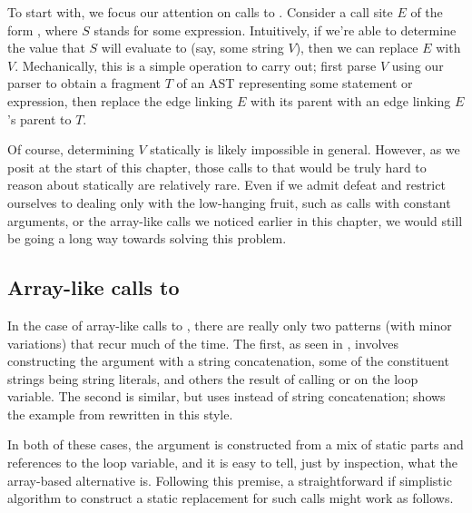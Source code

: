 To start with, we focus our attention on calls to . Consider a call
site $E$ of the form , where $S$ stands for some \matlab
expression. Intuitively, if we're able to determine the value that $S$ will
evaluate to (say, some string $V$), then we can replace $E$ with $V$.
Mechanically, this is a simple operation to carry out; first parse $V$ using
our \matlab parser to obtain a fragment $T$ of an AST representing some
statement or expression, then replace the edge linking $E$ with its parent with
an edge linking $E$'s parent to $T$.

Of course, determining $V$ statically is likely impossible in general. However,
as we posit at the start of this chapter, those calls to  that would
be truly hard to reason about statically are relatively rare. Even if we admit
defeat and restrict ourselves to dealing only with the low-hanging fruit, such
as calls with constant arguments, or the array-like calls we noticed earlier in
this chapter, we would still be going a long way towards solving this problem.

\subsection{Array-like calls to }

In the case of array-like calls to , there are really only two
patterns (with minor variations) that recur much of the time. The first, as
seen in , involves constructing the argument with a
string concatenation, some of the constituent strings being string
literals, and others the result of calling  or  on
the loop variable. The second is similar, but uses  instead of
string concatenation;  shows the example from
 rewritten in this style.



In both of these cases, the argument is constructed from a mix of static parts
and references to the loop variable, and it is easy to tell, just by
inspection, what the array-based alternative is. Following this premise, a
straightforward if simplistic algorithm to construct a static replacement
for such calls might work as follows.

